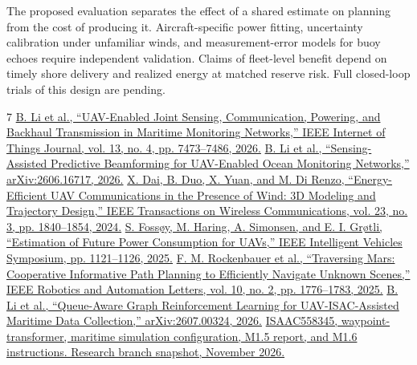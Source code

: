 \documentclass[journal]{IEEEtran}
\begin{document}
The proposed evaluation separates the effect of a shared estimate on planning from the cost of producing it. Aircraft-specific power fitting, uncertainty calibration under unfamiliar winds, and measurement-error models for buoy echoes require independent validation. Claims of fleet-level benefit depend on timely shore delivery and realized energy at matched reserve risk. Full closed-loop trials of this design are pending.

\begin{thebibliography}{7}
\href{https://doi.org/10.1109/JIOT.2025.3639003}{B. Li et al., “UAV-Enabled Joint Sensing, Communication, Powering, and Backhaul Transmission in Maritime Monitoring Networks,” IEEE Internet of Things Journal, vol. 13, no. 4, pp. 7473–7486, 2026.}
\href{https://arxiv.org/abs/2606.16717}{B. Li et al., “Sensing-Assisted Predictive Beamforming for UAV-Enabled Ocean Monitoring Networks,” arXiv:2606.16717, 2026.}
\href{https://doi.org/10.1109/TWC.2023.3292290}{X. Dai, B. Duo, X. Yuan, and M. Di Renzo, “Energy-Efficient UAV Communications in the Presence of Wind: 3D Modeling and Trajectory Design,” IEEE Transactions on Wireless Communications, vol. 23, no. 3, pp. 1840–1854, 2024.}
\href{https://doi.org/10.1109/IV64158.2025.11097689}{S. Fossøy, M. Haring, A. Simonsen, and E. I. Grøtli, “Estimation of Future Power Consumption for UAVs,” IEEE Intelligent Vehicles Symposium, pp. 1121–1126, 2025.}
\href{https://doi.org/10.1109/LRA.2024.3513036}{F. M. Rockenbauer et al., “Traversing Mars: Cooperative Informative Path Planning to Efficiently Navigate Unknown Scenes,” IEEE Robotics and Automation Letters, vol. 10, no. 2, pp. 1776–1783, 2025.}
\href{https://arxiv.org/abs/2607.00324}{B. Li et al., “Queue-Aware Graph Reinforcement Learning for UAV-ISAC-Assisted Maritime Data Collection,” arXiv:2607.00324, 2026.}
\href{https://github.com/ISAAC558345/waypoint-transformer/tree/e44e5227caa71c2bb5150fe7a1ab62c6fd7fbd05}{ISAAC558345, waypoint-transformer, maritime simulation configuration, M1.5 report, and M1.6 instructions. Research branch snapshot, November 2026.}
\end{thebibliography}
\end{document}
